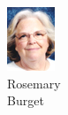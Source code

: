 \begin{figure}[H]
\begin{subfigure}[b]{0.1\textwidth}
                \includegraphics[width=\textwidth]{mugs/BurgetRosemary}
                \caption*{Rosemary \\ Burget}
        \end{subfigure}
                ~ %
        \begin{subfigure}[b]{0.1\textwidth}

\end{subfigure}
\end{figure}
